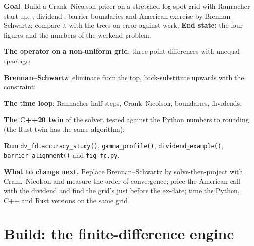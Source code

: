\begin{tutorial}
\textbf{Goal.} Build a Crank--Nicolson pricer on a stretched log-spot grid with Rannacher start-up, , dividend ,
barrier boundaries and American exercise by Brennan--Schwartz; compare it with the trees on error against work. \textbf{End state:} the four
figures and the numbers of the weekend problem.
\begin{tutsteps}
\item \textbf{The operator on a non-uniform grid}: three-point differences with unequal spacings:
\label{lst:dv:trees-and-finite-difference-pricers-in-practice:operator}
\item \textbf{Brennan--Schwartz}: eliminate from the top, back-substitute upwards with the constraint:
\label{lst:dv:trees-and-finite-difference-pricers-in-practice:bs}
\item \textbf{The time loop}: Rannacher half steps, Crank--Nicolson, boundaries, dividends:
\label{lst:dv:trees-and-finite-difference-pricers-in-practice:loop}
\item \textbf{The C++20 twin} of the solver, tested against the Python numbers to rounding (the Rust twin has the same algorithm):
\label{lst:dv:trees-and-finite-difference-pricers-in-practice:cpp}
\item \textbf{Run} \texttt{dv\_fd.accuracy\_study()}, \texttt{gamma\_profile()}, \texttt{dividend\_example()}, \texttt{barrier\_alignment()} and
\texttt{fig\_fd.py}.
\end{tutsteps}
\textbf{What to change next.} Replace Brennan--Schwartz by solve-then-project with Crank--Nicolson and measure the order of convergence; price the
American call with the dividend and find the grid's  just before the ex-date; time the Python, C++ and Rust versions on the same
grid.
\end{tutorial}

\section{Build: the finite-difference engine}\label{bld:dv:trees-and-finite-difference-pricers-in-practice:fdpricer}

